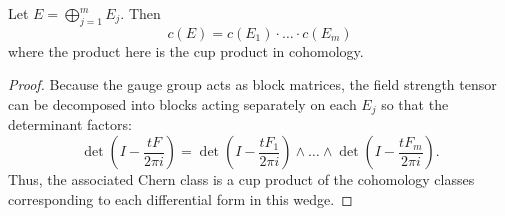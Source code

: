 		
 		\begin{prop}
 			Let $E = \bigoplus_{j=1}^m E_j$. Then
 			\[
 				c(E) = c(E_1) \cdot \dots \cdot c(E_m)
 			\]
			where the product here is the cup product in cohomology.
 		\end{prop}
 		\begin{proof}
 			Because the gauge group acts as block matrices, the field strength tensor can be decomposed into blocks acting separately on each $E_j$ so that the determinant factors:
 			\[
 				\det\left(I - \frac{t F}{2\pi i}\right) = \det\left(I - \frac{t F_1}{2\pi i}\right) \wedge \dots \wedge \det \left(I - \frac{t F_m}{2\pi i}\right).
 			\]
			Thus, the associated Chern class is a cup product of the cohomology classes corresponding to each differential form in this wedge.
 		\end{proof}
		 